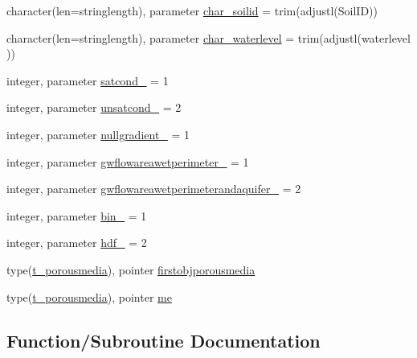 \begin{DoxyCompactItemize}
\item 
character(len=stringlength), parameter \mbox{\hyperlink{namespacemoduleporousmedia_a06f39391019fe9f68e0830e66d8d30dd}{char\+\_\+soilid}} = trim(adjustl(\textquotesingle{}Soil\+ID\textquotesingle{}))
\item 
character(len=stringlength), parameter \mbox{\hyperlink{namespacemoduleporousmedia_a60c5e507d9236adaed3b8caee85cb0ec}{char\+\_\+waterlevel}} = trim(adjustl(\textquotesingle{}waterlevel\textquotesingle{} ))
\item 
integer, parameter \mbox{\hyperlink{namespacemoduleporousmedia_aeaa5af14db3a8d6228eac80c7211c516}{satcond\+\_\+}} = 1
\item 
integer, parameter \mbox{\hyperlink{namespacemoduleporousmedia_a481df84cb04f10c7675c50d66767c218}{unsatcond\+\_\+}} = 2
\item 
integer, parameter \mbox{\hyperlink{namespacemoduleporousmedia_a891aed761f4141d1e05c29c1862dd3e0}{nullgradient\+\_\+}} = 1
\item 
integer, parameter \mbox{\hyperlink{namespacemoduleporousmedia_a8bebb0b791a472f99c709f85976dde27}{gwflowareawetperimeter\+\_\+}} = 1
\item 
integer, parameter \mbox{\hyperlink{namespacemoduleporousmedia_a73014666c1653e31d4f9322e0b6d07de}{gwflowareawetperimeterandaquifer\+\_\+}} = 2
\item 
integer, parameter \mbox{\hyperlink{namespacemoduleporousmedia_afac9099ee4b4a056a09dac528e6d391c}{bin\+\_\+}} = 1
\item 
integer, parameter \mbox{\hyperlink{namespacemoduleporousmedia_a08e7e01d3e63f79377cf1be17529922d}{hdf\+\_\+}} = 2
\item 
type(\mbox{\hyperlink{structmoduleporousmedia_1_1t__porousmedia}{t\+\_\+porousmedia}}), pointer \mbox{\hyperlink{namespacemoduleporousmedia_adce3f6c3cf611a0ec921e0f59f8564fd}{firstobjporousmedia}}
\item 
type(\mbox{\hyperlink{structmoduleporousmedia_1_1t__porousmedia}{t\+\_\+porousmedia}}), pointer \mbox{\hyperlink{namespacemoduleporousmedia_a3e17aaf8157066d02072051194e1dcb0}{me}}
\end{DoxyCompactItemize}


\subsection{Function/\+Subroutine Documentation}
\mbox{\label{namespacemoduleporousmedia_a96f689b9636ed899f8e42b8e37d1e63d}} 
